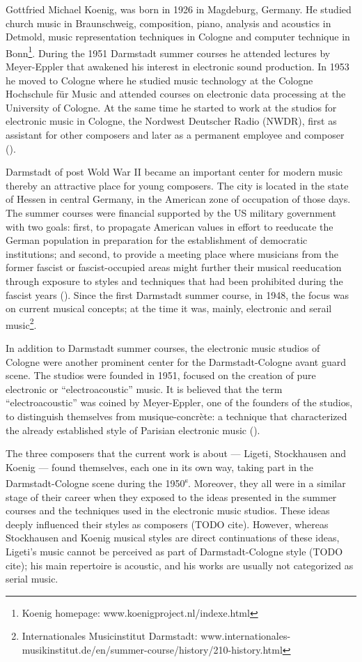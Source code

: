 \documentclass[a4paper,11pt]{article}
\begin{document}
Gottfried Michael Koenig, was born in 1926 in Magdeburg, Germany.
He studied church music in Braunschweig, composition, piano, analysis and acoustics in Detmold, music representation techniques in Cologne and computer technique in Bonn\footnote{Koenig homepage: www.koenigproject.nl/indexe.html}.
During the 1951 Darmstadt summer courses he attended lectures by Meyer-Eppler that awakened his interest in electronic sound production.
In 1953 he moved to Cologne where he studied music technology at the Cologne Hochschule f{\"u}r Music and attended courses on electronic data processing at the University of Cologne.
At the same time he started to work at the studios for electronic music in Cologne, the Nordwest Deutscher Radio (NWDR), first as assistant for other composers and later as a permanent employee and composer (\cite{koenig_grove}).

Darmstadt of post Wold War II became an important center for modern music thereby an attractive place for young composers.
The city is located in the state of Hessen in central Germany, in the American zone of occupation of those days.
The summer courses were financial supported by the US military government with two goals:
first, to propagate American values in effort to reeducate the German population in preparation for the establishment of democratic institutions;
and second, to provide a meeting place where musicians from the former fascist or fascist-occupied areas might further their musical reeducation through exposure to styles and techniques that had been prohibited during the fascist years (\cite{darmstadt_oxford}).
Since the first Darmstadt summer course, in 1948, the focus was on current musical concepts;
at the time it was, mainly, electronic and serail music\footnote{Internationales Musicinstitut Darmstadt: www.internationales-musikinstitut.de/en/summer-course/history/210-history.html}.

In addition to Darmstadt summer courses, the electronic music studios of Cologne were another prominent center for the Darmstadt-Cologne avant guard scene.
The studios were founded in 1951, focused on the creation of pure electronic or ``electroacoustic'' music.
It is believed that the term ``electroacoustic'' was coined by Meyer-Eppler, one of the founders of the studios, to distinguish themselves from musique-concr{\`e}te:
a technique that characterized the already established style of Parisian electronic music (\cite{nwdr}).

The three composers that the current work is about --- Ligeti, Stockhausen and Koenig --- found themselves, each one in its own way, taking part in the Darmstadt-Cologne scene during the 1950\textsuperscript{s}.
Moreover, they all were in a similar stage of their career when they exposed to the ideas presented in the summer courses and the techniques used in the electronic music studios.
These ideas deeply influenced their styles as composers (TODO cite).
However, whereas Stockhausen and Koenig musical styles are direct continuations of these ideas, Ligeti's music cannot be perceived as part of Darmstadt-Cologne style (TODO cite);
his main repertoire is acoustic, and his works are usually not categorized as serial music.
\end{document}
